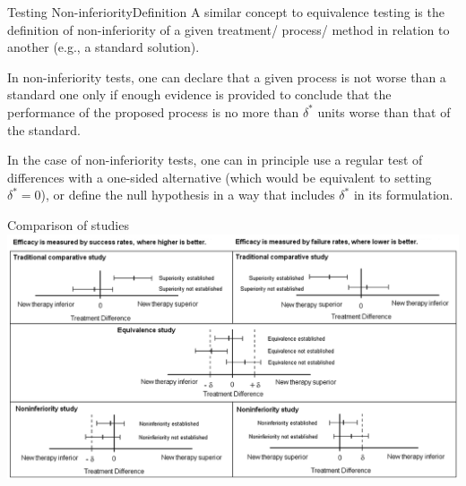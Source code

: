 \begin{frame}{Testing Non-inferiority}{Definition}
A similar concept to equivalence testing is the definition of non-inferiority of a given treatment/ process/ method in relation to another (e.g., a standard solution).
\bigskip

In non-inferiority tests, one can declare that a given process is not worse than a standard one only if enough evidence is provided to conclude that the performance of the proposed process is no more than $\delta^*$ units worse than that of the standard.
\bigskip

In the case of non-inferiority tests, one can in principle use a regular test of differences with a one-sided alternative (which would be equivalent to setting $\delta^* = 0$), or define the null hypothesis in a way that includes $\delta^*$ in its formulation.
\end{frame}


\begin{frame}{Comparison of studies}
\includegraphics[width=\textwidth]{../img/TOST.png}
\end{frame}



